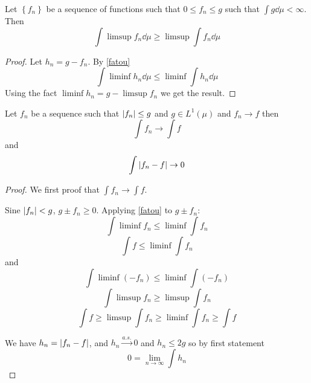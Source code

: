 \begin{lemma}
	 Let $\left\{  f_n\right\}$ be a sequence of functions such that $0\leq f_n\leq g$ such that $\int g\dd{\mu} <\infty$. Then
	 $$\int \limsup f_n \dd{\mu}\geq \limsup \int f_n \dd{\mu}$$
	 \begin{proof}
	 	Let $h_n = g-f_n$. By \ref{fatou} $$\int \liminf h_n \dd{\mu} \leq \liminf \int h_n \dd{\mu}$$
	 	Using the fact $\liminf h_n = g -\limsup f_n$ we get the result.
	 \end{proof}
\end{lemma}
\begin{theorem}
	Let $f_n$ be a sequence such that $\abs{f_n}\leq g$ and $g\in L^1(\mu)$ and $f_n\to f$ then
$$\int f_n \to \int f$$
and 
$$\int \abs{f_n-f} \to 0 $$
\begin{proof}
	We first proof that $\int f_n \to \int f$.
	
	
	Sine $\abs{f_n} < g$, $g\pm f_n \geq 0$. Applying \ref{fatou} to $g\pm f_n $:
	$$\int \liminf f_n \leq \liminf \int f_n$$
	$$\int f \leq \liminf \int f_n$$
	and
	$$\int \liminf (-f_n) \leq \liminf \int (-f_n)$$
	$$\int \limsup f_n \geq \limsup \int f_n$$
	$$\int f \geq \limsup \int f_n \geq \liminf \int f_n \geq \int f$$
	
	We have $h_n = \abs{f_n-f}$, and $h_n \stackrel{a.s.}{\to} 0$ and $h_n \leq 2g$ so by first statement
	$$0 = \lim_{n\to \infty} \int h_n$$
	
\end{proof}
\end{theorem}


